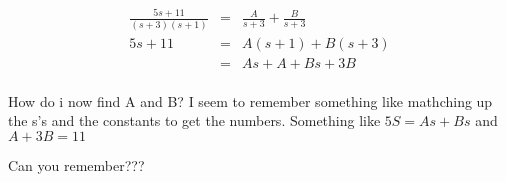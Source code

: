 \documentclass[a4paper,10pt]{report}
\begin{document}
\begin{eqnarray*}
  \frac{5s+11}{(s+3)(s+1)} & = &\frac{A}{s+3} + \frac{B}{s+3} \\
  5s+11 & = & A(s+1) + B(s+3) \\
  {} & = & As+A + Bs+3B \\
\end{eqnarray*}

How do i now find A and B?
I seem to remember something like mathching up the s's and the constants to get the numbers.
Something like $5S = As + Bs $ and $A + 3B = 11$

Can you remember???
\end{document}
